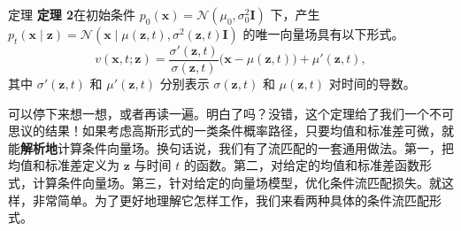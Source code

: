 \begin{booknote}{定理 }
\textbf{定理 2}\quad 在初始条件 $p_0(\mathbf x)=\mathcal N(\mu_0,\sigma_0^2\mathbf I)$ 下，产生
$p_t(\mathbf x\mid\mathbf z)=\mathcal N(\mathbf x\mid\mu(\mathbf z,t),\sigma^2(\mathbf z,t)\mathbf I)$
的唯一向量场具有以下形式。
\begin{equation}
  v(\mathbf x,t;\mathbf z)
  =\frac{\sigma'(\mathbf z,t)}{\sigma(\mathbf z,t)}
  \bigl(\mathbf x-\mu(\mathbf z,t)\bigr)+\mu'(\mathbf z,t),
  \tag{9.64}\label{eq:09-64}
\end{equation}
其中 $\sigma'(\mathbf z,t)$ 和 $\mu'(\mathbf z,t)$ 分别表示 $\sigma(\mathbf z,t)$ 和 $\mu(\mathbf z,t)$ 对时间的导数。
\end{booknote}

可以停下来想一想，或者再读一遍。明白了吗？没错，这个定理给了我们一个不可思议的结果！如果考虑高斯形式的一类条件概率路径，只要均值和标准差可微，就能\textbf{解析地}计算条件向量场。换句话说，我们有了流匹配的一套通用做法。第一，把均值和标准差定义为 $\mathbf z$ 与时间 $t$ 的函数。第二，对给定的均值和标准差函数形式，计算条件向量场。第三，针对给定的向量场模型，优化条件流匹配损失。就这样，非常简单。为了更好地理解它怎样工作，我们来看两种具体的条件流匹配形式。
